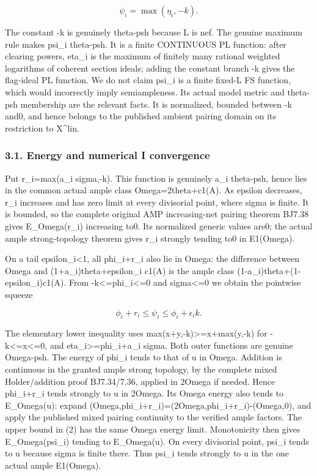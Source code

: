 \documentclass[
  10pt,
]{article}
\begin{document}
\[\psi_i=\max(\eta_i,-k).\tag{1}\]

The constant -k is genuinely theta-psh because L is nef. The genuine
maximum rule makes psi\_i theta-psh. It is a finite CONTINUOUS PL
function: after clearing powers, eta\_i is the maximum of finitely many
rational weighted logarithms of coherent section ideals; adding the
constant branch -k gives the flag-ideal PL function. We do not claim
psi\_i is a finite fixed-L FS function, which would incorrectly imply
semiampleness. Its actual model metric and theta-psh membership are the
relevant facts. It is normalized, bounded between -k and0, and hence
belongs to the published ambient pairing domain on its restriction to
X\^{}lin.

\subsubsection{3.1. Energy and numerical I
convergence}\label{energy-and-numerical-i-convergence}

Put r\_i=max(a\_i sigma,-k). This function is genuinely a\_i theta-psh,
hence lies in the common actual ample class Omega=2theta+c1(A). As
epsilon decreases, r\_i increases and has zero limit at every divisorial
point, where sigma is finite. It is bounded, so the complete original
AMP increasing-net pairing theorem BJ7.38 gives E\_Omega(r\_i)
increasing to0. Its normalized generic values are0; the actual ample
strong-topology theorem gives r\_i strongly tending to0 in E1(Omega).

On a tail epsilon\_i\textless1, all phi\_i+r\_i also lie in Omega: the
difference between Omega and (1+a\_i)theta+epsilon\_i c1(A) is the ample
class (1-a\_i)theta+(1-epsilon\_i)c1(A). From
-k\textless=phi\_i\textless=0 and sigma\textless=0 we obtain the
pointwise squeeze

\[\phi_i+r_i\leq\psi_i\leq\phi_i+\epsilon_i k.\tag{2}\]

The elementary lower inequality uses max(x+y,-k)\textgreater=x+max(y,-k)
for -k\textless=x\textless=0, and eta\_i\textgreater=phi\_i+a\_i sigma.
Both outer functions are genuine Omega-psh. The energy of phi\_i tends
to that of u in Omega. Addition is continuous in the granted ample
strong topology, by the complete mixed Holder/addition proof
BJ7.34/7.36, applied in 2Omega if needed. Hence phi\_i+r\_i tends
strongly to u in 2Omega. Its Omega energy also tends to E\_Omega(u):
expand (Omega,phi\_i+r\_i)=(2Omega,phi\_i+r\_i)-(Omega,0), and apply the
published mixed pairing continuity to the verified ample factors. The
upper bound in (2) has the same Omega energy limit. Monotonicity then
gives E\_Omega(psi\_i) tending to E\_Omega(u). On every divisorial
point, psi\_i tends to u because sigma is finite there. Thus psi\_i
tends strongly to u in the one actual ample E1(Omega).
\end{document}
